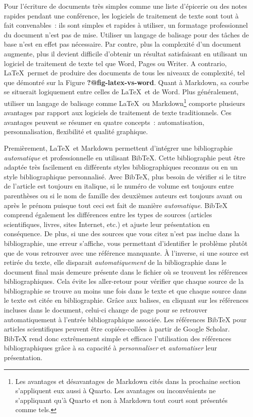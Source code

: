 \documentclass[
  letterpaper,
]{scrbook}
\begin{document}
Pour l'écriture de documents très simples comme une liste d'épicerie ou
des notes rapides pendant une conférence, les logiciels de traitement de
texte sont tout à fait convenables~: ils sont simples et rapides à
utiliser, un formatage professionnel du document n'est pas de mise.
Utiliser un langage de balisage pour des tâches de base n'est en effet
pas nécessaire. Par contre, plus la complexité d'un document augmente,
plus il devient difficile d'obtenir un résultat satisfaisant en
utilisant un logiciel de traitement de texte tel que Word, Pages ou
Writer. A contrario, \LaTeX~permet de produire des documents de tous les
niveaux de complexité, tel que démontré sur la Figure
\textbf{?@fig-latex-vs-word}. Quant à Markdown, sa courbe se situerait
logiquement entre celles de \LaTeX~et de Word. Plus généralement,
utiliser un langage de balisage comme \LaTeX~ou Markdown\footnote{Les
  avantages et désavantages de Markdown cités dans la prochaine section
  s'appliquent eux aussi à Quarto. Les avantages ou inconvénients ne
  s'appliquant qu'à Quarto et non à Markdown tout court sont présentés
  comme tels.} comporte plusieurs avantages par rapport aux logiciels de
traitement de texte traditionnels. Ces avantages peuvent se résumer en
quatre concepts~: automatisation, personnalisation, flexibilité et
qualité graphique.

Premièrement, \LaTeX~et Markdown permettent d'intégrer une bibliographie
\emph{automatique} et professionnelle en utilisant BibTeX. Cette
bibliographie peut être adaptée très facilement en différents styles
bibliographiques reconnus ou en un style bibliographique personnalisé.
Avec BibTeX, plus besoin de vérifier si le titre de l'article est
toujours en italique, si le numéro de volume est toujours entre
parenthèses ou si le nom de famille des deuxièmes auteurs est toujours
avant ou après le prénom puisque tout ceci est fait de manière
\emph{automatique}. BibTeX comprend également les différences entre les
types de sources (articles scientifiques, livres, sites Internet, etc.)
et ajuste leur présentation en conséquence. De plus, si une des sources
que vous citez n'est pas inclue dans la bibliographie, une erreur
s'affiche, vous permettant d'identifier le problème plutôt que de vous
retrouver avec une référence manquante. À l'inverse, si une source est
retirée du texte, elle disparait \emph{automatiquement} de la
bibliographie dans le document final mais demeure présente dans le
fichier où se trouvent les références bibliographiques. Cela évite les
aller-retour pour vérifier que chaque source de la bibliographie se
trouve au moins une fois dans le texte et que chaque source dans le
texte est citée en bibliographie. Grâce aux balises, en cliquant sur les
références incluses dans le document, celui-ci change de page pour se
retrouver automatiquement à l'entrée bibliographique associée. Les
références BibTeX pour articles scientifiques peuvent être
copiées-collées à partir de Google Scholar. BibTeX rend donc extrêmement
simple et efficace l'utilisation des références bibliographiques grâce à
sa capacité à \emph{personnaliser} et \emph{automatiser} leur
présentation.
\end{document}
